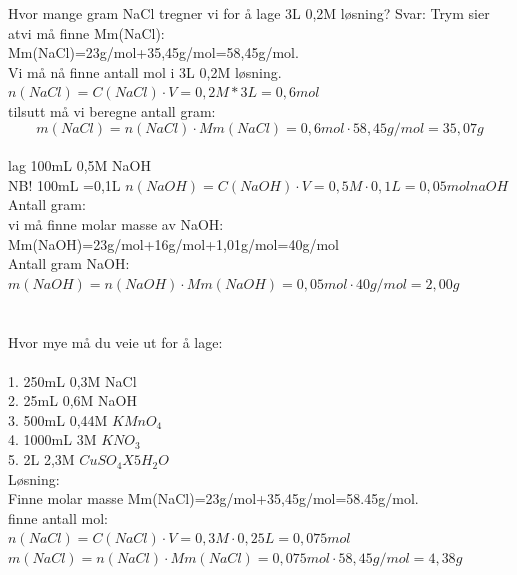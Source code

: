 \documentclass[a4paper,12pt]{article}
\begin{document}
Hvor mange gram NaCl tregner vi for å lage 3L 0,2M løsning?
Svar:  Trym sier atvi må finne Mm(NaCl):\\
Mm(NaCl)=23g/mol+35,45g/mol=58,45g/mol.\\
Vi må nå finne antall mol i 3L 0,2M løsning.\\
$n(NaCl)=C(NaCl)\cdot V=0,2M*3L=0,6mol$\\
tilsutt må vi beregne antall gram:
$$m(NaCl)=n(NaCl)\cdot Mm(NaCl)=0,6mol\cdot 58,45g/mol=35,07g$$\\
lag 100mL 0,5M NaOH\\
NB! 100mL =0,1L  $n(NaOH)=C(NaOH)\cdot V=0,5M\cdot 0,1L=0,05mol naOH$
Antall gram:\\
vi må finne molar masse av NaOH: Mm(NaOH)=23g/mol+16g/mol+1,01g/mol=40g/mol\\
Antall gram NaOH:\\
$m(NaOH)=n(NaOH)\cdot Mm(NaOH)=0,05mol\cdot 40g/mol=2,00g$\\\\\\
Hvor mye må du veie ut for å lage:\\\\
1. 250mL 0,3M NaCl\\
2. 25mL 0,6M NaOH\\
3. 500mL 0,44M $KMnO_4$ \\
4. 1000mL 3M $KNO_3$\\
5. 2L 2,3M $CuSO_4X5H_2O$\\
Løsning:\\
Finne molar masse Mm(NaCl)=23g/mol+35,45g/mol=58.45g/mol.\\
finne antall mol:\\
$n(NaCl)=C(NaCl)\cdot V=0,3M\cdot 0,25L=0,075mol$ \\
$m(NaCl)=n(NaCl)\cdot Mm(NaCl)=0,075mol\cdot 58,45g/mol=4,38g$
\end{document}
